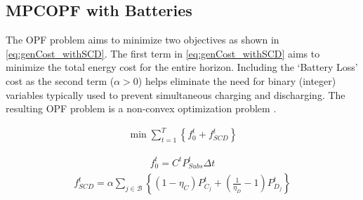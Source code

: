 \documentclass[../../outputs/main.tex]{subfiles}
\begin{document}
\subsection{MPCOPF with Batteries}
The OPF problem aims to minimize two objectives as shown in \cref{eq:genCost_withSCD}. The first term in \cref{eq:genCost_withSCD} aims to minimize the total energy cost for the entire horizon. Including the `Battery Loss' cost as the second term ($\alpha > 0$) helps eliminate the need for binary (integer) variables typically used to prevent simultaneous charging and discharging. The resulting OPF problem is a non-convex optimization problem \cite{Nazir2021Sep}.

\begin{align}
    \min \sum_{t = 1}^{T} \left\{ f_0^t + f_{SCD}^t \right\}
    \label{eq:genCost_withSCD}
\end{align}

\begin{align}
    f_0^t = C^t P^t_{Subs} \Delta t \nonumber
\end{align}
\begin{align}
    f_{SCD}^t = \alpha \sum_{j \in \mathcal{B}} \left\{ (1-\eta_C)P^t_{C_j} + \left( \frac{1}{\eta_D} - 1 \right) P^t_{D_j} \right\} \nonumber
\end{align}
\end{document}
